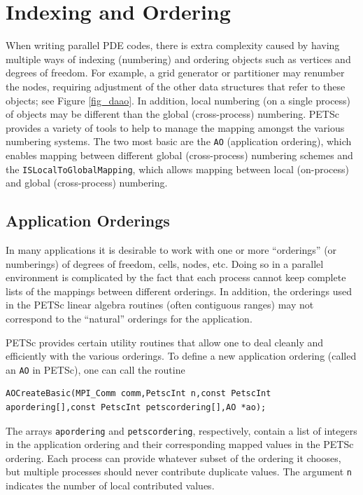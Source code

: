 \section{Indexing and Ordering}
\label{sec_indexingandordering}

  When writing parallel PDE codes, there is extra complexity caused by
having multiple ways of indexing (numbering) and ordering objects such
as vertices and degrees of freedom. For example, a grid generator
or partitioner may renumber the nodes, requiring adjustment of the
other data structures that refer to these objects; see Figure
\ref{fig_daao}.  In addition, local numbering (on a single process)
of objects may be different than the global (cross-process)
numbering. PETSc provides a variety of tools to help to manage the
mapping amongst the various numbering systems. The two most basic are
the \lstinline{AO} (application ordering), which enables mapping between
different global (cross-process) numbering schemes and the \lstinline{ISLocalToGlobalMapping}, which allows mapping between local
(on-process) and global (cross-process) numbering.

\subsection{Application Orderings}
\label{sec_ao}

In many applications it is desirable to work with one or more
``orderings'' (or numberings) of degrees of freedom, cells, nodes,
etc.   Doing so in a parallel environment is
complicated by the fact that each process cannot keep complete lists
of the mappings between different orderings. In addition, the
orderings used in the PETSc linear algebra routines (often contiguous
ranges) may not correspond to the ``natural'' orderings for the application.

PETSc provides certain utility routines that allow one to deal cleanly
and efficiently with the various orderings. To define a new application ordering
(called an \lstinline{AO} in PETSc), one can call the routine
\begin{lstlisting}
AOCreateBasic(MPI_Comm comm,PetscInt n,const PetscInt apordering[],const PetscInt petscordering[],AO *ao);
\end{lstlisting}
The arrays \lstinline{apordering} and \lstinline{petscordering}, respectively, contain a list of integers
in the application ordering and their corresponding mapped values in the PETSc
ordering. Each process can provide whatever subset of the ordering it
chooses, but multiple processes should never contribute duplicate values.
The argument \lstinline{n} indicates the number of local contributed values.

